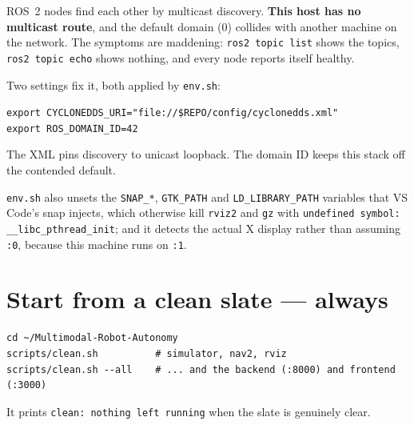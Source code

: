 \documentclass[11pt,a4paper]{report}
\newcommand{\file}[1]{\texttt{\small #1}}
\begin{document}
\begin{plain}
ROS~2 nodes find each other by multicast discovery. \textbf{This host has no
multicast route}, and the default domain (0) collides with another machine on
the network. The symptoms are maddening: \file{ros2 topic list} shows the
topics, \file{ros2 topic echo} shows nothing, and every node reports itself
healthy.

Two settings fix it, both applied by \file{env.sh}:
\begin{center}
\file{export CYCLONEDDS\_URI="file://\$REPO/config/cyclonedds.xml"} \\
\file{export ROS\_DOMAIN\_ID=42}
\end{center}
The XML pins discovery to unicast loopback. The domain ID keeps this stack off
the contended default.

\smallskip
\file{env.sh} also unsets the \file{SNAP\_*}, \file{GTK\_PATH} and
\file{LD\_LIBRARY\_PATH} variables that VS Code's snap injects, which otherwise
kill \file{rviz2} and \file{gz} with
\file{undefined symbol: \_\_libc\_pthread\_init}; and it detects the actual
X display rather than assuming \file{:0}, because this machine runs on
\file{:1}.
\end{plain}

\section{Start from a clean slate --- always}

\begin{plain}[Terminal 0]
\begin{verbatim}
cd ~/Multimodal-Robot-Autonomy
scripts/clean.sh          # simulator, nav2, rviz
scripts/clean.sh --all    # ... and the backend (:8000) and frontend (:3000)
\end{verbatim}
It prints \file{clean: nothing left running} when the slate is genuinely clear.
\end{plain}
\end{document}
